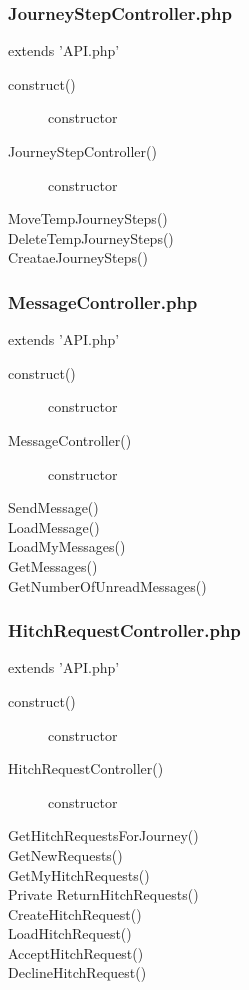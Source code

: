 \documentclass[11pt]{article}
\begin{document}
\subsubsection{Journey\textunderscore Step\textunderscore Controller.php}
extends 'API.php'
\begin{description}
\item[\textunderscore \textunderscore construct()] constructor
\item[Journey\textunderscore Step\textunderscore Controller()] constructor
\item[MoveTempJourneySteps()]
\item[DeleteTempJourneySteps()]
\item[CreataeJourneySteps()]
\end{description}

\subsubsection{Message\textunderscore Controller.php}
extends 'API.php'
\begin{description}
\item[\textunderscore \textunderscore construct()] constructor
\item[Message\textunderscore Controller()] constructor
\item[SendMessage()]
\item[LoadMessage()]
\item[LoadMyMessages()]
\item[GetMessages()]
\item[GetNumberOfUnreadMessages()]
\end{description}

\subsubsection{Hitch\textunderscore Request\textunderscore Controller.php}
extends 'API.php'
\begin{description}
\item[\textunderscore \textunderscore construct()] constructor
\item[Hitch\textunderscore Request\textunderscore Controller()] constructor
\item[GetHitchRequestsForJourney()]
\item[GetNewRequests()]
\item[GetMyHitchRequests()]
\item[Private ReturnHitchRequests()]
\item[CreateHitchRequest()]
\item[LoadHitchRequest()]
\item[AcceptHitchRequest()]
\item[DeclineHitchRequest()]
\end{description}
\end{document}

